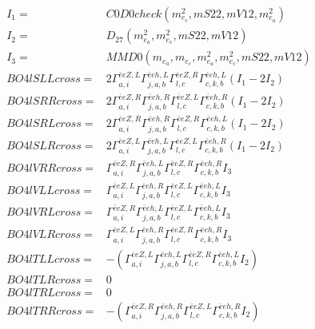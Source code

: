 \documentclass[A4,landscape]{article}
\begin{document}
\begin{align} 
I_1 = & C0D0check(m^2_{e_{{c}}}, mS22, mV12, m^2_{e_{{a}}}) \\ 
I_2 = & D_{27}(m^2_{e_{{a}}}, m^2_{e_{{c}}}, mS22, mV12) \\ 
I_3 = & MMD0(m_{e_{{a}}}, m_{e_{{c}}}, m^2_{e_{{a}}}, m^2_{e_{{c}}}, mS22, mV12) \\ 
  BO4lSLLcross= & 2  \Gamma^{\bar{e}e Z ,L}_{a, i} \Gamma^{\bar{e}e h ,L}_{j, a, b} \Gamma^{\bar{e}e Z ,R}_{l, c} \Gamma^{\bar{e}e h ,L}_{c, k, b} (I_1 - 2 I_2) \\ 
  BO4lSRRcross= & 2  \Gamma^{\bar{e}e Z ,R}_{a, i} \Gamma^{\bar{e}e h ,R}_{j, a, b} \Gamma^{\bar{e}e Z ,L}_{l, c} \Gamma^{\bar{e}e h ,R}_{c, k, b} (I_1 - 2 I_2) \\ 
  BO4lSRLcross= & 2  \Gamma^{\bar{e}e Z ,R}_{a, i} \Gamma^{\bar{e}e h ,R}_{j, a, b} \Gamma^{\bar{e}e Z ,R}_{l, c} \Gamma^{\bar{e}e h ,L}_{c, k, b} (I_1 - 2 I_2) \\ 
  BO4lSLRcross= & 2  \Gamma^{\bar{e}e Z ,L}_{a, i} \Gamma^{\bar{e}e h ,L}_{j, a, b} \Gamma^{\bar{e}e Z ,L}_{l, c} \Gamma^{\bar{e}e h ,R}_{c, k, b} (I_1 - 2 I_2) \\ 
  BO4lVRRcross= &  \Gamma^{\bar{e}e Z ,R}_{a, i} \Gamma^{\bar{e}e h ,L}_{j, a, b} \Gamma^{\bar{e}e Z ,R}_{l, c} \Gamma^{\bar{e}e h ,R}_{c, k, b} I_3 \\ 
  BO4lVLLcross= &  \Gamma^{\bar{e}e Z ,L}_{a, i} \Gamma^{\bar{e}e h ,R}_{j, a, b} \Gamma^{\bar{e}e Z ,L}_{l, c} \Gamma^{\bar{e}e h ,L}_{c, k, b} I_3 \\ 
  BO4lVRLcross= &  \Gamma^{\bar{e}e Z ,R}_{a, i} \Gamma^{\bar{e}e h ,L}_{j, a, b} \Gamma^{\bar{e}e Z ,L}_{l, c} \Gamma^{\bar{e}e h ,L}_{c, k, b} I_3 \\ 
  BO4lVLRcross= &  \Gamma^{\bar{e}e Z ,L}_{a, i} \Gamma^{\bar{e}e h ,R}_{j, a, b} \Gamma^{\bar{e}e Z ,R}_{l, c} \Gamma^{\bar{e}e h ,R}_{c, k, b} I_3 \\ 
  BO4lTLLcross= & -( \Gamma^{\bar{e}e Z ,L}_{a, i} \Gamma^{\bar{e}e h ,L}_{j, a, b} \Gamma^{\bar{e}e Z ,R}_{l, c} \Gamma^{\bar{e}e h ,L}_{c, k, b} I_2) \\ 
  BO4lTLRcross= & 0 \\ 
  BO4lTRLcross= & 0 \\ 
  BO4lTRRcross= & -( \Gamma^{\bar{e}e Z ,R}_{a, i} \Gamma^{\bar{e}e h ,R}_{j, a, b} \Gamma^{\bar{e}e Z ,L}_{l, c} \Gamma^{\bar{e}e h ,R}_{c, k, b} I_2) \\ 
\end{align} 
\end{document}
